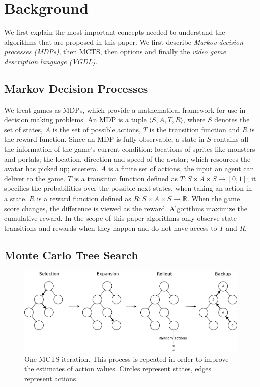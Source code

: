 \section{Background}
\label{sec:background}

We first explain the most important concepts needed to understand the
algorithms that are proposed in this paper. We first describe \emph{Markov
decision processes (MDPs)}, then  MCTS, then options and finally the \emph{video
game description language (VGDL)}.

\subsection{Markov Decision Processes}
\label{subsec:mdps}
We treat games as MDPs, which provide a mathematical framework for use in
decision making problems. An MDP is a tuple $\langle S, A, T, R \rangle$, where
$S$ denotes the set of states, $A$ is the set of possible actions, $T$ is the
transition function and $R$ is the reward function. Since an MDP is fully
observable, a state in $S$ contains all the information of the game's current
condition: locations of sprites like monsters and portals; the location,
direction and speed of the avatar; which resources the avatar has picked up;
etcetera. $A$ is a finite set of actions, the input an agent can deliver to the
game. $T$ is a transition function defined as $T : S \times A \times S
\rightarrow \left[0,1\right]$; it specifies the probabilities over the possible
next states, when taking an action in a state.  $R$ is a reward function defined
as $R: S \times A \times S \rightarrow \mathbb{R}$. When the game score changes,
the difference is viewed as the reward.  Algorithms maximize the cumulative
reward. In the scope of this paper algorithms only observe state transitions
and rewards when they happen and do not have access to $T$ and $R$.

\subsection{Monte Carlo Tree Search}
\begin{figure}
	\centering
	\includegraphics[width=\columnwidth]{includes/mcts-wide-eps-converted-to}
	\caption{One MCTS iteration. This process is repeated in order to improve
	the estimates of action values. Circles represent states, edges represent
	actions.}
\label{fig:mcts}
\end{figure}

